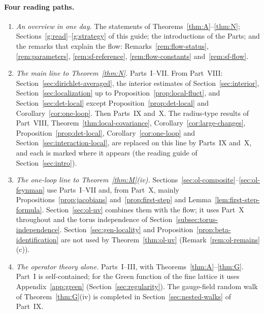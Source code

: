 \paragraph{Four reading paths.}
\begin{enumerate}[label=(\alph*)]
\item \emph{An overview in one day.} The statements of Theorems~\ref{thm:A}--\ref{thm:N}; Sections~\ref{g:read}--\ref{g:strategy} of this guide; the introductions of the Parts; and the remarks that explain the flow: Remarks~\ref{rem:flow-status}, \ref{rem:parameters}, \ref{rem:sf-reference}, \ref{rem:flow-constants} and~\ref{rem:sf-flow}.
\item \emph{The main line to Theorem~\ref{thm:N}.} Parts~I--VII. From Part~VIII: Section~\ref{sec:dirichlet-averaged}, the interior estimates of Section~\ref{sec:interior}, Section~\ref{sec:localization} up to Proposition~\ref{prop:local-fluct}, and Section~\ref{sec:det-local} except Proposition~\ref{prop:det-local} and Corollary~\ref{cor:one-loop}. Then Parts~IX and~X. The radius-type results of Part~VIII, Theorem~\ref{thm:local-covariance}, Corollary~\ref{cor:large-changes}, Proposition~\ref{prop:det-local}, Corollary~\ref{cor:one-loop} and Section~\ref{sec:interaction-local}, are replaced on this line by Parts~IX and~X, and each is marked where it appears (the reading guide of Section~\ref{sec:intro}).
\item \emph{The one-loop line to Theorem~\ref{thm:M}(iv).} Sections~\ref{sec:ol-composite}--\ref{sec:ol-feynman} use Parts~I--VII and, from Part~X, mainly Propositions~\ref{prop:jacobians} and~\ref{prop:first-step} and Lemma~\ref{lem:first-step-formula}. Section~\ref{sec:ol-uv} combines them with the flow; it uses Part~X throughout and the torus independence of Section~\ref{subsec:torus-independence}. Section~\ref{sec:gen-locality} and Proposition~\ref{prop:beta-identification} are not used by Theorem~\ref{thm:ol-uv} (Remark~\ref{rem:ol-remains}(c)).
\item \emph{The operator theory alone.} Parts~I--III, with Theorems~\ref{thm:A}--\ref{thm:G}. Part~I is self-contained; for the Green function of the fine lattice it uses Appendix~\ref{app:green} (Section~\ref{sec:regularity}). The gauge-field random walk of Theorem~\ref{thm:G}(iv) is completed in Section~\ref{sec:nested-walks} of Part~IX.
\end{enumerate}

